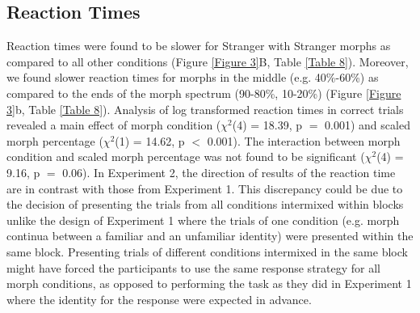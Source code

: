 \documentclass[10pt,letterpaper]{article}
\begin{document}
\subsection*{Reaction Times}
Reaction times were found to be slower for Stranger with Stranger morphs as compared to all other conditions (Figure \ref{Figure 3}B, Table \ref{Table 8}). Moreover, we found slower reaction times for morphs in the middle (e.g. 40\%-60\%) as compared to the ends of the morph spectrum (90-80\%, 10-20\%) (Figure \ref{Figure 3}b, Table \ref{Table 8}). Analysis of log transformed reaction times in correct trials revealed a main effect of morph condition (\( \chi^2 \)(4) = 18.39, p $=$ 0.001) and scaled morph percentage (\( \chi^2 \)(1) = 14.62, p $<$ 0.001). The interaction between morph condition and scaled morph percentage was not found to be significant (\( \chi^2 \)(4) = 9.16, p $=$ 0.06). In Experiment 2, the direction of results of the reaction time are in contrast with those from Experiment 1. This discrepancy could be due to the decision of presenting the trials from all conditions intermixed within blocks unlike the design of Experiment 1 where the trials of one condition (e.g. morph continua between a familiar and an unfamiliar identity) were presented within the same block. Presenting trials of different conditions intermixed in the same block might have forced the participants to use the same response strategy for all morph conditions, as opposed to performing the task as they did in Experiment 1 where the identity for the response were expected in advance.  
\end{document}
